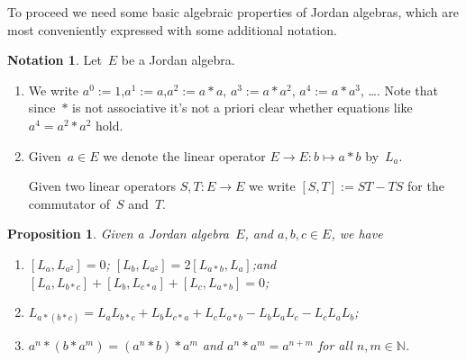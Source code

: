 \documentclass[submission,copyright,creativecommons]{eptcs}
\newcounter{main}
\newtheorem{proposition}[main]{Proposition}
\theoremstyle{definition}
\newtheorem{notation}[main]{Notation}
\newcommand\N{\mathbb{N}}
\begin{document}
To proceed we need some basic algebraic properties
of Jordan algebras, which are most conveniently expressed
with some additional notation.
\begin{notation}
Let~$E$ be a Jordan algebra.
\begin{enumerate}
\item
We write $a^0:=1$,\quad $a^1:= a$,\quad  $a^2:= a*a$,\quad  
		$a^3:= a*a^2$,\quad 
$a^4:=a*a^3$, \dots .
Note that since~$*$ is not associative
it's not a priori clear whether equations like  $a^4 = a^2 * a^2$ hold.
\item
Given~$a\in E$ we denote the linear operator $E\to E\colon b\mapsto a*b$
by~$L_a$.

Given two linear operators $S,T\colon E\to E$
we write  $[S,T]:= ST-TS$ for the commutator of~$S$ and~$T$.
\end{enumerate}

\end{notation}
\begin{proposition}
\label{jaeqs}
Given a Jordan algebra~$E$,
and $a,b,c\in E$, we have
\begin{enumerate}
\item
\label{jaeqs-1}
$[L_a,L_{a^2}] = 0$;\quad
$[L_b,L_{a^2}] = 2[L_{a*b},L_{a}]$;\quad and\quad  
$[L_a,L_{b*c}] + [L_b,L_{c*a}] + [L_c,L_{a*b}] = 0$;
\item
\label{jaeqs-2}
$L_{a*(b*c)} = L_aL_{b*c} + L_b L_{c*a} + L_c L_{a*b} - L_b L_a L_c - 
L_c L_a L_b$;
\item
\label{jaeqs-3}
$a^n*(b*a^m)=(a^n*b)*a^m$
\quad and\quad
		$a^n * a^m = a^{n+m}$\quad
	for all $n,m\in \N$.
\end{enumerate}
\end{proposition}
\end{document}
